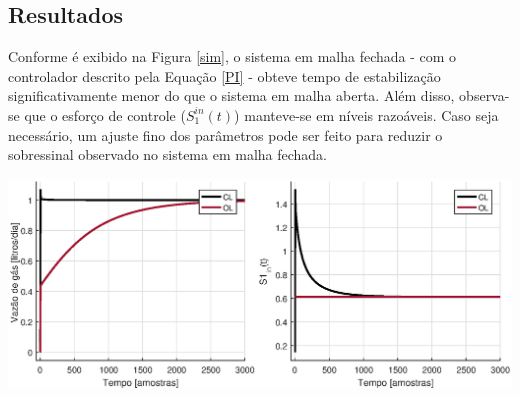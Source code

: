 \documentclass[a0,portrait]{a0poster}
\begin{document}
\begin{multicols}{2}
\section*{Resultados}

\quad Conforme é exibido na Figura \ref{sim}, o sistema em malha fechada - com o controlador descrito pela Equação \ref{PI} - obteve tempo de estabilização significativamente menor do que o sistema em malha aberta. Além disso, observa-se que o esforço de controle ($S_1^{in} (t)$) manteve-se em níveis razoáveis. Caso seja necessário, um ajuste fino dos parâmetros pode ser feito para reduzir o sobressinal observado no sistema em malha fechada.

\begin{center}
\includegraphics[width=.9\linewidth]{comparacao.eps}
 \label{sim}
\end{center}



 

   

\end{multicols}
\end{document}
